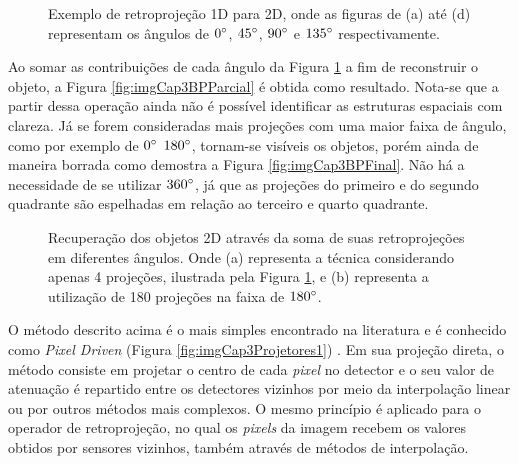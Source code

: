 \begin{figure}[H]
	\centering
	
	\caption{Exemplo de retroprojeção \acs{1D} para \acs{2D}, onde as figuras de (a) até (d) representam os ângulos de $0\degree$, $45\degree$, $90\degree$ e $135\degree$ respectivamente.}
	
	\hfil
	\hfil
	\hfil
	\hfil
	
	\label{fig:imgCap3BPMosaico}
\end{figure}


Ao somar as contribuições de cada ângulo da Figura \ref{fig:imgCap3BPMosaico} a fim de reconstruir o objeto, a Figura \ref{fig:imgCap3BPParcial} é obtida como resultado. Nota-se que a partir dessa operação ainda não é possível identificar as estruturas espaciais com clareza. Já se forem consideradas mais projeções com uma maior faixa de ângulo, como por exemplo de $0\degree$  $180\degree$, tornam-se visíveis os objetos, porém ainda de maneira borrada como demostra a Figura \ref{fig:imgCap3BPFinal}. Não há a necessidade de se utilizar $360\degree$, já que as projeções do primeiro e do segundo quadrante são espelhadas em relação ao terceiro e quarto quadrante.   

\begin{figure}[H]
	\centering
	
	\caption{Recuperação dos objetos \acs{2D} através da soma de suas retroprojeções em diferentes ângulos. Onde (a) representa a técnica considerando apenas 4 projeções, ilustrada pela Figura \ref{fig:imgCap3BPMosaico}, e (b) representa a utilização de 180 projeções na faixa de $180\degree$.}
	
	\hfil
	\hfil
	
	\label{fig:imgCap3BPSoma}
\end{figure}

O método descrito acima é o mais simples encontrado na literatura e é conhecido como \textit{Pixel Driven} (Figura \ref{fig:imgCap3Projetores1}) \cite[p. 47]{levakhina2014three}. Em sua projeção direta, o método consiste em projetar o centro de cada \textit{pixel} no detector e o seu valor de atenuação é repartido entre os detectores vizinhos por meio da interpolação linear ou por outros métodos mais complexos. O mesmo princípio é aplicado para o operador de retroprojeção, no qual os \textit{pixels} da imagem recebem os valores obtidos por sensores vizinhos, também através de métodos de interpolação.

